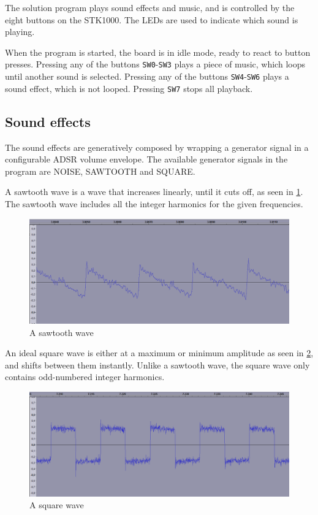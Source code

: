 The solution program plays sound effects and music, and is controlled by the eight buttons on the STK1000.
The LEDs are used to indicate which sound is playing.

When the program is started, the board is in idle mode, ready to react to button presses.
Pressing any of the buttons \texttt{SW0}-\texttt{SW3} plays a piece of music, which loops until another sound is selected.
Pressing any of the buttons \texttt{SW4}-\texttt{SW6} plays a sound effect, which is not looped.
Pressing \texttt{SW7} stops all playback.

\subsection{Sound effects}

The sound effects are generatively composed by wrapping a generator signal in a configurable ADSR volume envelope.
The available generator signals in the program are NOISE, SAWTOOTH and SQUARE.

A sawtooth wave is a wave that increases linearly, until it cuts off, as seen in \ref{img-sw5zoom}.
The sawtooth wave includes all the integer harmonics for the given frequencies.
\begin{figure}[H]
	\includegraphics[width = \textwidth]{images/SW5zoom.png}
	\caption{A sawtooth wave}
	\label{img-sw5zoom}
\end{figure}

An ideal square wave is either at a maximum or minimum amplitude as seen in \ref{img-sw4zoom}, and shifts between them instantly.
Unlike a sawtooth wave, the square wave only contains odd-numbered integer harmonics.
\begin{figure}[H]
	\includegraphics[width = \textwidth]{images/SW4zoom.png}
	\caption{A square wave}
	\label{img-sw4zoom}
\end{figure}

